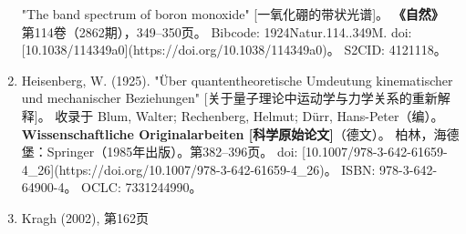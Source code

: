 \begin{enumerate}
  "The band spectrum of boron monoxide" [一氧化硼的带状光谱]。  
  \textbf{《自然》} 第114卷（2862期），349–350页。  
  Bibcode: 1924Natur.114..349M.  
  doi: [10.1038/114349a0](https://doi.org/10.1038/114349a0)。  
  S2CID: 4121118。  
\item Heisenberg, W. (1925).  
  "Über quantentheoretische Umdeutung kinematischer und mechanischer Beziehungen" [关于量子理论中运动学与力学关系的重新解释]。  
  收录于 Blum, Walter; Rechenberg, Helmut; Dürr, Hans-Peter（编）。  
  \textbf{Wissenschaftliche Originalarbeiten [科学原始论文]}（德文）。  
  柏林，海德堡：Springer（1985年出版）。第382–396页。  
  doi: [10.1007/978-3-642-61659-4_26](https://doi.org/10.1007/978-3-642-61659-4_26)。  
  ISBN: 978-3-642-64900-4。  
  OCLC: 7331244990。  
\item Kragh (2002), 第162页 


\end{enumerate}
